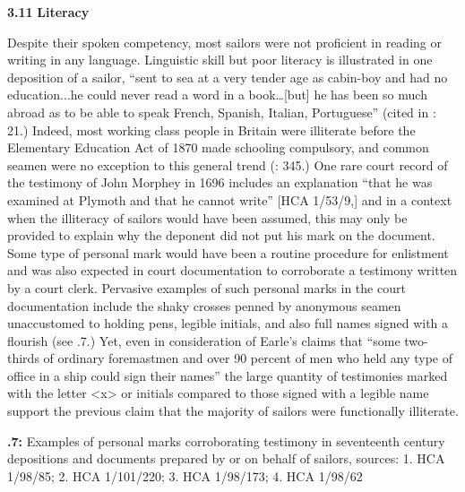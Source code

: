   
 


\textbf{3.11} \textbf{Literacy}

  Despite their spoken competency, most sailors were not proficient in reading or writing in any language. Linguistic skill but poor literacy is illustrated in one deposition of a sailor, “sent to sea at a very tender age as cabin-boy and had no education...he could never read a word in a book…[but] he has been so much abroad as to be able to speak French, Spanish, Italian, Portuguese” (cited in \citealt{Earle1998}: 21.) Indeed, most working class people in Britain were illiterate before the Elementary Education Act of 1870 made schooling compulsory, and common seamen were no exception to this general trend (\citealt{AdkinsAdkins2008}: 345.) One rare court record of the testimony of John Morphey in 1696 includes an explanation “that he was examined at Plymoth and that he cannot write” [HCA 1/53/9,] and in a context when the illiteracy of sailors would have been assumed, this may only be provided to explain why the deponent did not put his mark on the document. Some type of personal mark would have been a routine procedure for enlistment and was also expected in court documentation to corroborate a testimony written by a court clerk. Pervasive examples of such personal marks in the court documentation include the shaky crosses penned by anonymous seamen unaccustomed to holding pens, legible initials, and also full names signed with a flourish (see .7.) Yet, even in consideration of Earle’s claims that “some two-thirds of ordinary foremastmen and over 90 percent of men who held any type of office in a ship could sign their names” \citep[20,]{Earle1998} the large quantity of testimonies marked with the letter <x> or initials compared to those signed with a legible name support the previous claim that the majority of sailors were functionally illiterate. 

  
 

\textbf{.7:} Examples of personal marks corroborating testimony in seventeenth century depositions and documents prepared by or on behalf of sailors, sources: 1. HCA 1/98/85; 2. HCA 1/101/220; 3. HCA 1/98/173; 4. HCA 1/98/62


